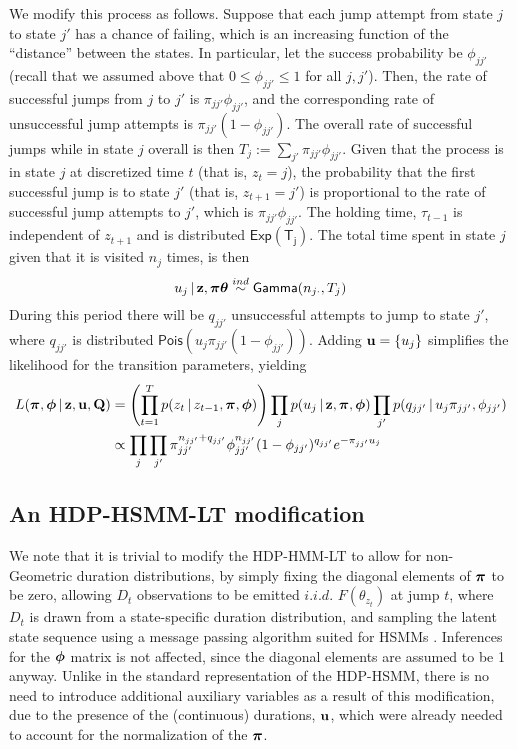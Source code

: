 We modify this process as follows.  
Suppose that each jump attempt from state $j$ to state $j'$ has a
chance of failing, which is an increasing function of the ``distance''
between the states.  In particular, let the success probability be
$\phi_{jj'}$ (recall that we assumed above that $0 \leq \phi_{jj'}
\leq 1$ for all $j,j'$).  Then, the rate of successful jumps from $j$
to $j'$ is $\pi_{jj'}\phi_{jj'}$, and the corresponding rate of unsuccessful jump
attempts is $\pi_{jj'}(1-\phi_{jj'})$.  The overall rate of successful jumps
while in state $j$ overall is then $T_j := \sum_{j'} \pi_{jj'} \phi_{jj'}$.
Given that the process is in state $j$ at discretized time $t$ (that is,
$z_{t} = j$), the probability that the first successful jump is to state $j'$ (that is, $z_{t+1} = j'$) 
is proportional to the rate of successful jump attempts to $j'$, which
is $\pi_{jj'}\phi_{jj'}$.  The holding time, $\tau_{t-1}$ is
independent of $z_{t+1}$ and is distributed $\mathsf{Exp(T_j)}$.  The
total time spent in state $j$ given that it is visited $n_{j}$ times,
is then
\begin{equation}
u_j \, \vert \, \mathbf{z}, \boldsymbol{\pi} \boldsymbol{\theta} \stackrel{ind}{\sim} \mathsf{Gamma}(n_{j\cdot},T_j)
\end{equation}
During this period there will be $q_{jj'}$
unsuccessful attempts to jump to state $j'$, where $q_{jj'}$ is distributed $\mathsf{Pois}(u_j
\pi_{jj'}(1 - \phi_{jj'}))$.  Adding
$\mathbf{u} = \{u_j\}$ simplifies the likelihood for the transition
parameters, yielding
\begin{align}
  L(\boldsymbol{\pi}, \boldsymbol{\phi} \, \vert \, \mathbf{z}, \mathbf{u}, \mathbf{Q}) &= \left(\prod_{t=1}^T p(z_{t} \, \vert \,
    z_{t-1}, \boldsymbol{\pi}, \boldsymbol{\phi})\right) \prod_{j} p(u_j \, \vert \, \mathbf{z}, \boldsymbol{\pi}, \boldsymbol{\phi})
  \prod_{j'} p(q_{jj'} \, \vert \, u_j \pi_{jj'}, \phi_{jj'}) \notag \\
  &\propto \prod_{j} \prod_{j'} \pi_{jj'}^{n_{jj'} + q_{jj'}} \phi_{jj'}^{n_{jj'}}
  (1-\phi_{jj'})^{q_{jj'}} e^{-\pi_{jj'}u_j} \label{eq:joint-likelihood}
\end{align}

\subsection{An HDP-HSMM-LT modification}
\label{sec:an-hsmm-modification}

We note that it is trivial to modify the HDP-HMM-LT to allow for
non-Geometric duration distributions, by simply fixing the diagonal
elements of $\boldsymbol{\pi}$ to be zero, allowing $D_t$ observations to be
emitted $i.i.d.$ $F(\theta_{z_t})$ at jump $t$, where $D_t$ is drawn
from a state-specific duration distribution, and sampling the
latent state sequence using a message passing algorithm suited for
HSMMs \cite{johnson2013bayesian}.  Inferences for the $\boldsymbol{\phi}$ matrix
is not affected, since the diagonal elements are assumed to be 1 anyway.
Unlike in the standard representation of the HDP-HSMM, there is no need to introduce
additional auxiliary variables as a result of this modification, due
to the presence of the (continuous) durations, $\mathbf{u}$, which were
already needed to account for the normalization of the $\boldsymbol{\pi}$.

